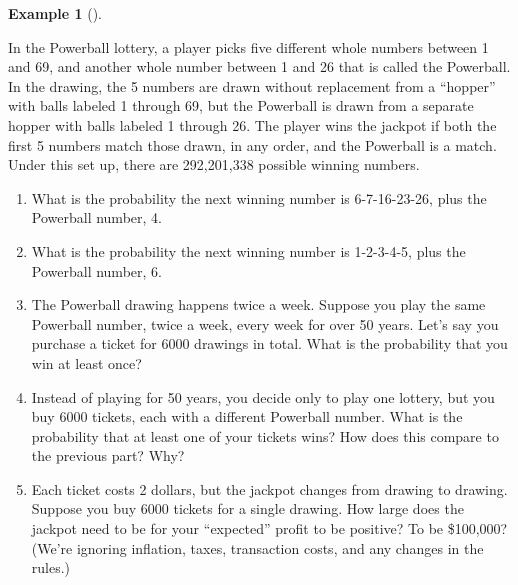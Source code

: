 \documentclass[
  letterpaper,
  DIV=11,
  numbers=noendperiod]{scrreprt}
\providecommand{\tightlist}{%
  \setlength{\itemsep}{0pt}\setlength{\parskip}{0pt}}
\theoremstyle{plain}
\theoremstyle{definition}
\newtheorem{example}{Example}[chapter]
\theoremstyle{definition}
\theoremstyle{definition}
\theoremstyle{remark}
\begin{document}
\begin{tcolorbox}[enhanced jigsaw, opacityback=0, left=2mm, colframe=quarto-callout-note-color-frame, toprule=.15mm, breakable, colback=white, leftrule=.75mm, arc=.35mm, rightrule=.15mm, bottomrule=.15mm]

\begin{example}[]\protect\hypertarget{exm-counting-lottery}{}\label{exm-counting-lottery}

In the Powerball lottery, a player picks five different whole numbers
between 1 and 69, and another whole number between 1 and 26 that is
called the Powerball.\\
In the drawing, the 5 numbers are drawn without replacement from a
``hopper'' with balls labeled 1 through 69, but the Powerball is drawn
from a separate hopper with balls labeled 1 through 26. The player wins
the jackpot if both the first 5 numbers match those drawn, in any order,
and the Powerball is a match. Under this set up, there are 292,201,338
possible winning numbers.

\begin{enumerate}
\def\labelenumi{\arabic{enumi}.}
\tightlist
\item
  What is the probability the next winning number is 6-7-16-23-26, plus
  the Powerball number, 4.
\item
  What is the probability the next winning number is 1-2-3-4-5, plus the
  Powerball number, 6.
\item
  The Powerball drawing happens twice a week. Suppose you play the same
  Powerball number, twice a week, every week for over 50 years. Let's
  say you purchase a ticket for 6000 drawings in total. What is the
  probability that you win at least once?
\item
  Instead of playing for 50 years, you decide only to play one lottery,
  but you buy 6000 tickets, each with a different Powerball number. What
  is the probability that at least one of your tickets wins? How does
  this compare to the previous part? Why?
\item
  Each ticket costs 2 dollars, but the jackpot changes from drawing to
  drawing. Suppose you buy 6000 tickets for a single drawing. How large
  does the jackpot need to be for your ``expected'' profit to be
  positive? To be \$100,000? (We're ignoring inflation, taxes,
  transaction costs, and any changes in the rules.)
\end{enumerate}

\end{example}

\end{tcolorbox}
\end{document}
